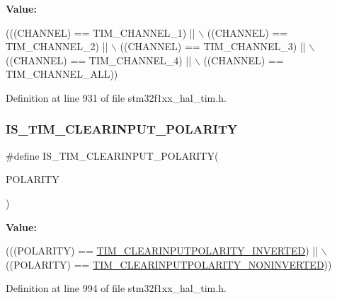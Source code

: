 {\bfseries Value\+:}
\begin{DoxyCode}
(((CHANNEL) == TIM\_CHANNEL\_1) || \(\backslash\)
                                  ((CHANNEL) == TIM\_CHANNEL\_2) || \(\backslash\)
                                  ((CHANNEL) == TIM\_CHANNEL\_3) || \(\backslash\)
                                  ((CHANNEL) == TIM\_CHANNEL\_4) || \(\backslash\)
                                  ((CHANNEL) == TIM\_CHANNEL\_ALL))
\end{DoxyCode}


Definition at line 931 of file stm32f1xx\+\_\+hal\+\_\+tim.\+h.

\mbox{\label{group___t_i_m___private___macros_ga6c4eb3c20538e04fb529368dd4aa7678}} 
\subsubsection{\texorpdfstring{I\+S\+\_\+\+T\+I\+M\+\_\+\+C\+L\+E\+A\+R\+I\+N\+P\+U\+T\+\_\+\+P\+O\+L\+A\+R\+I\+TY}{IS\_TIM\_CLEARINPUT\_POLARITY}}
{\footnotesize\ttfamily \#define I\+S\+\_\+\+T\+I\+M\+\_\+\+C\+L\+E\+A\+R\+I\+N\+P\+U\+T\+\_\+\+P\+O\+L\+A\+R\+I\+TY(\begin{DoxyParamCaption}\item[{}]{P\+O\+L\+A\+R\+I\+TY }\end{DoxyParamCaption})}

{\bfseries Value\+:}
\begin{DoxyCode}
(((POLARITY) == \hyperlink{group___t_i_m___clear_input___polarity_ga02e0d10a2cf90016d1a8be1931c6c67e}{TIM\_CLEARINPUTPOLARITY\_INVERTED}) || \(\backslash\)
                                              ((POLARITY) == 
      \hyperlink{group___t_i_m___clear_input___polarity_ga53e02f7692e6996389b462219572f2a9}{TIM\_CLEARINPUTPOLARITY\_NONINVERTED}))
\end{DoxyCode}


Definition at line 994 of file stm32f1xx\+\_\+hal\+\_\+tim.\+h.

\mbox{\label{group___t_i_m___private___macros_ga225bf3db31b1e78c2ef826da1a2e0934}} 
